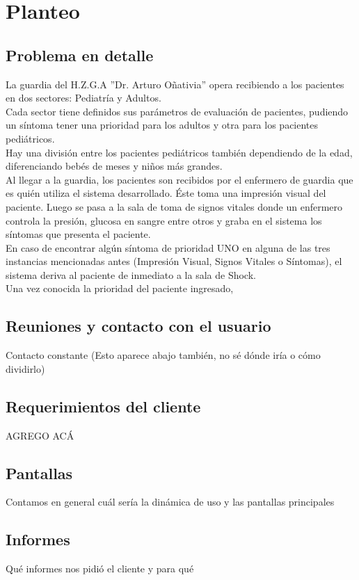 \section{Planteo}
\subsection{Problema en detalle}
La guardia del H.Z.G.A ''Dr. Arturo Oñativia'' opera recibiendo a los pacientes en dos sectores: Pediatría y Adultos. \\
Cada sector tiene definidos sus parámetros de evaluación de pacientes, pudiendo un síntoma tener una prioridad para los adultos y otra para los pacientes pediátricos.\\
Hay una división entre los pacientes pediátricos también dependiendo de la edad, diferenciando bebés de meses y niños más grandes.\\
Al llegar a la guardia, los pacientes son recibidos por el enfermero de guardia que es quién utiliza el sistema desarrollado. Éste toma una impresión visual del paciente. Luego se pasa a la sala de toma de signos vitales donde un enfermero controla la presión, glucosa en sangre entre otros y graba en el sistema los síntomas que presenta el paciente. \\
En caso de encontrar algún síntoma de prioridad UNO en alguna de las tres instancias mencionadas antes (Impresión Visual, Signos Vitales o Síntomas), el sistema deriva al paciente de inmediato a la sala de Shock.  \\
Una vez conocida la prioridad del paciente ingresado, 



\subsection{Reuniones y contacto con el usuario}
Contacto constante (Esto aparece abajo también, no sé dónde iría o cómo dividirlo)
\subsection{Requerimientos del cliente}
AGREGO ACÁ
\subsection{Pantallas}
Contamos en general cuál sería la dinámica de uso y las pantallas principales
\subsection{Informes}
Qué informes nos pidió el cliente y para qué

